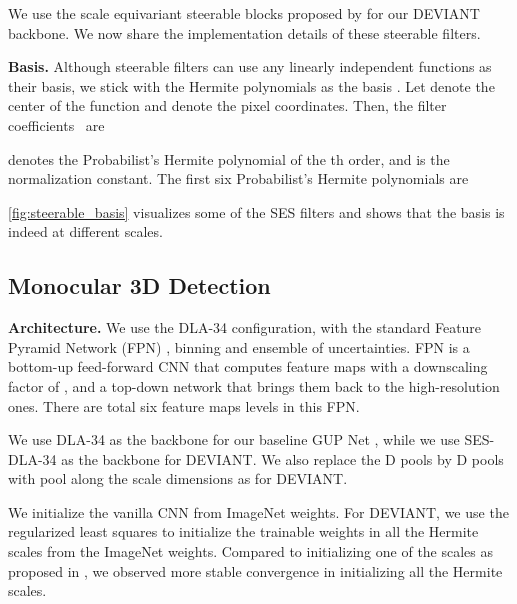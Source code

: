 \documentclass[runningheads]{llncs}
\newcommand{\twoD}{D}
\newcommand{\threeD}{D}
\newcommand{\equivariant} {equivariant}
\newcommand{\scaleEquivariant} {scale \equivariant}
\newcommand{\ses}{SES}
\newcommand{\dla}{DLA-34}
\newcommand{\imageNet}{ImageNet}
\newcommand{\gupNet}{GUP Net}
\newcommand{\noIndentHeading}[1]{\noindent\textbf{#1}}
\newcommand{\methodName}{DEVIANT}
\begin{document}
        We use the \scaleEquivariant{} steerable blocks proposed by \cite{sosnovik2021siamese} for our \methodName{} backbone. 
        We now share the implementation details of these steerable filters.
        
\noIndentHeading{Basis.}
        Although steerable filters can use any linearly independent functions as their basis, we stick with the Hermite polynomials as the basis \cite{sosnovik2021siamese}.
        Let  denote the center of the function and  denote the pixel coordinates. 
        Then, the filter coefficients~ \cite{sosnovik2021siamese} are         
        
         denotes the Probabilist's Hermite polynomial of the th order, and  is the normalization constant. 
        The first six Probabilist's Hermite polynomials are
        
        \cref{fig:steerable_basis} visualizes some of the \ses{} filters and shows that the basis is indeed at different scales.



\subsection{Monocular 3D Detection}\label{sec:detection_training_additional}

\noIndentHeading{Architecture.}
            We use the \dla{} \cite{yu2018deep} configuration, with the standard Feature Pyramid Network (FPN) \cite{lin2017feature}, binning and ensemble of uncertainties.
            FPN is a bottom-up feed-forward CNN that computes feature maps with a downscaling factor of , and a top-down network that brings them back to the high-resolution ones.
            There are total six feature maps levels in this FPN.
            
            We use \dla{} as the backbone for our baseline \gupNet{} \cite{lu2021geometry}, while we use \ses-\dla{} as the backbone for \methodName{}.
            We also replace the \twoD{} pools by \threeD{} pools with pool along the scale dimensions as  for \methodName{}.
            
            We initialize the vanilla CNN from \imageNet{} weights. 
            For \methodName, we use the regularized least squares \cite{sosnovik2021siamese} to initialize the trainable weights in all the Hermite scales from the \imageNet{} \cite{deng2009imagenet} weights.
            Compared to initializing one of the scales as proposed in \cite{sosnovik2021siamese}, we observed more stable convergence in initializing all the Hermite scales.
            
\end{document}

